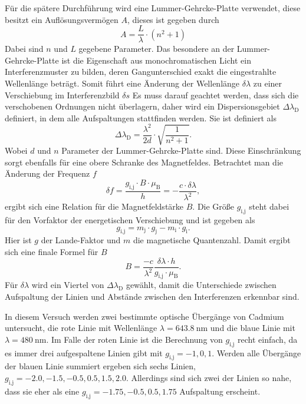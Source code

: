 Für die spätere Durchführung wird eine Lummer-Gehrcke-Platte verwendet, diese besitzt ein Auflösungsvermögen $A$, dieses ist gegeben durch 
\begin{equation}
    A = \frac{L}{\lambda} \cdot \left( n^2 + 1 \right)
   \label{eq:aufloesung}
\end{equation}
Dabei sind $n$ und $L$ gegebene Parameter.
Das besondere an der Lummer-Gehrcke-Platte ist die Eigenschaft aus monochromatischen Licht ein Interferenzmuster zu bilden, deren Gangunterschied exakt die eingestrahlte Wellenlänge beträgt.
Somit führt eine Änderung der Wellenlänge $\delta \lambda$ zu einer Verschiebung im Interferenzbild  $\delta s$
Es muss darauf geachtet werden, dass sich die verschobenen Ordnungen nicht überlagern, daher wird ein Dispersionsgebiet $\Delta \lambda _\text{D}$ definiert, in dem alle Aufspaltungen stattfinden werden. 
Sie ist definiert als 
\begin{equation}
    \Delta \lambda _\text{D} = \frac{\lambda ^2}{2 d} \cdot \sqrt{ \frac{1}{n^2 + 1}    }.
   \label{eq:dispers}
\end{equation}
Wobei $d$ und $n$ Parameter der Lummer-Gehrcke-Platte sind. 
Diese Einschränkung sorgt ebenfalls für eine obere Schranke des Magnetfeldes.
Betrachtet man die Änderung der Frequenz $f$
\begin{equation}
    \delta f = \frac{g_\text{i,j} \cdot B \cdot \mu _\text{B}}{h} = - \frac{c \cdot \delta \lambda}{\lambda ^2},
   \label{eq:freq}
\end{equation}
ergibt sich eine Relation für die Magnetfeldstärke $B$.
Die Größe $g_\text{i,j}$ steht dabei für den Vorfaktor der energetischen Verschiebung und ist gegeben als
\begin{equation}
    g_\text{i,j} = m_\text{j} \cdot g_\text{j} - m_\text{i} \cdot g_\text{i}.
   \label{eq:gij}
\end{equation}
Hier ist $g$ der Lande-Faktor und $m$ die magnetische Quantenzahl.
Damit ergibt sich eine finale Formel für $B$
\begin{equation}
    B =  \frac{- c}{\lambda ^2} \frac{\delta \lambda \cdot h}{g_\text{i,j}  \cdot \mu _\text{B}}.
   \label{eq:bfeld}
\end{equation}
Für $\delta \lambda $ wird ein Viertel von $\Delta \lambda _\text{D}$ gewählt, damit die Unterschiede zwischen Aufspaltung der Linien und Abstände zwischen den Interferenzen erkennbar sind.

In diesem Versuch werden zwei bestimmte optische Übergänge von Cadmium untersucht, die rote Linie mit Wellenlänge $\lambda = \SI{643.8}{\nano\meter}$ 
und die blaue Linie mit $\lambda = \SI{480}{\nano\meter}$.
Im Falle der roten Linie ist die Berechnung von $g_\text{i,j}$ recht einfach, da es immer drei aufgespaltene Linien gibt mit $g_\text{i,j} = -1, 0, 1$.
Werden alle Übergänge der blauen Linie summiert ergeben sich sechs Linien, $g_\text{i,j} = -2.0, -1.5, -0.5, 0.5, 1.5, 2.0$.
Allerdings sind sich zwei der Linien so nahe, dass sie eher als eine $g_\text{i,j} = -1.75, -0.5, 0.5, 1.75$ Aufspaltung erscheint.